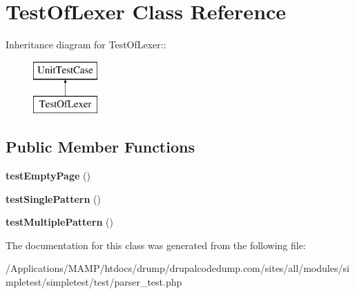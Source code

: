 \hypertarget{class_test_of_lexer}{
\section{TestOfLexer Class Reference}
\label{class_test_of_lexer}
}
Inheritance diagram for TestOfLexer::\begin{figure}[H]
\begin{center}
\leavevmode
\includegraphics[height=2cm]{class_test_of_lexer}
\end{center}
\end{figure}
\subsection*{Public Member Functions}
\begin{DoxyCompactItemize}
\item 
\hypertarget{class_test_of_lexer_a996f2638fd8f6132834039a0a024133b}{
{\bfseries testEmptyPage} ()}
\label{class_test_of_lexer_a996f2638fd8f6132834039a0a024133b}

\item 
\hypertarget{class_test_of_lexer_a05f3261bf292f0ce8170c8a681b072c5}{
{\bfseries testSinglePattern} ()}
\label{class_test_of_lexer_a05f3261bf292f0ce8170c8a681b072c5}

\item 
\hypertarget{class_test_of_lexer_a974cb8208178dfccd5ee15936b5bb177}{
{\bfseries testMultiplePattern} ()}
\label{class_test_of_lexer_a974cb8208178dfccd5ee15936b5bb177}

\end{DoxyCompactItemize}


The documentation for this class was generated from the following file:\begin{DoxyCompactItemize}
\item 
/Applications/MAMP/htdocs/drump/drupalcodedump.com/sites/all/modules/simpletest/simpletest/test/parser\_\-test.php\end{DoxyCompactItemize}

